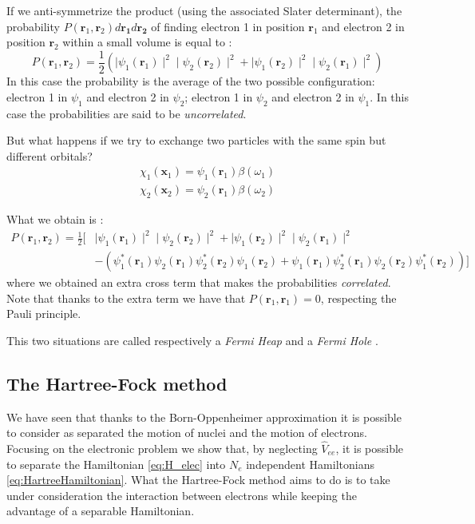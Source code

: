 \documentclass[a4paper,12pt]{article}
\begin{document}
If we anti-symmetrize the product (using the associated Slater determinant), the probability $P(\mathbf{r}_{1},\mathbf{r}_{2}) d\mathbf{r_{1}} d\mathbf{r_{2}}$ of finding electron 1 in position $\mathbf{r}_{1}$ and electron 2 in position $\mathbf{r}_{2}$ within a small volume is equal to \cite[p.52]{Attila}:
\begin{equation*}
	P(\mathbf{r}_{1},\mathbf{r}_{2}) = 
		\frac{1}{2} ( 
			\mid \psi_{1}(\mathbf{r}_1) \mid ^2    
			\mid \psi_{2}(\mathbf{r}_2) \mid ^2   
				+
			\mid \psi_{1}(\mathbf{r}_2) \mid ^2    
			\mid \psi_{2}(\mathbf{r}_1) \mid ^2   
			)
\end{equation*}
In this case the probability is the average of the two possible configuration: electron 1 in $\psi_1$ and electron 2 in $\psi_2$; electron 1 in $\psi_2$ and electron 2 in $\psi_1$.
In this case the probabilities are said to be \textit{uncorrelated}.

But what happens if we try to exchange two particles with the same spin but different orbitals?
\begin{align*}
	\chi_{1}(\mathbf{x}_{1}) = \psi_{1}(\mathbf{r}_{1}) \beta(\omega_{1})\\
	\chi_{2}(\mathbf{x}_{2}) = \psi_{2}(\mathbf{r}_{1}) \beta(\omega_{2})
\end{align*}

What we obtain is \cite[p.53]{Attila}:
\begin{align*}
	P(\mathbf{r}_{1},\mathbf{r}_{2}) = 
		\frac{1}{2} [ &
			\mid \psi_{1}(\mathbf{r}_1) \mid ^2    
			\mid \psi_{2}(\mathbf{r}_2) \mid ^2   
				+
			\mid \psi_{1}(\mathbf{r}_2) \mid ^2    
			\mid \psi_{2}(\mathbf{r}_1) \mid ^2   
\\
			& - ( \psi_{1}^*(\mathbf{r}_1) \psi_{2}(\mathbf{r}_1) \psi_{2}^*(\mathbf{r}_2) \psi_{1}(\mathbf{r}_2)
			 + \psi_{1}(\mathbf{r}_1) \psi_{2}^*(\mathbf{r}_1) \psi_{2}(\mathbf{r}_2) \psi_{1}^*(\mathbf{r}_2))]
\end{align*}
where we obtained an extra cross term that makes the probabilities \textit{correlated}. Note that thanks to the extra term we have that $P(\mathbf{r}_{1},\mathbf{r}_{1}) = 0$, respecting the Pauli principle.

This two situations are called respectively a \textit{Fermi Heap} and a \textit{Fermi Hole} \cite{Dan}.


\subsection{The Hartree-Fock method}
We have seen that thanks to the Born-Oppenheimer approximation it is possible to consider as separated the motion of nuclei and the motion of electrons. 
Focusing on the electronic problem we show that, by neglecting $\hat{V}_{ee}$, it is possible to separate the Hamiltonian \eqref{eq:H_elec} into $N_e$ independent Hamiltonians \eqref{eq:HartreeHamiltonian}.
What the Hartree-Fock method aims to do is to take under consideration the interaction between electrons while keeping the advantage of a separable Hamiltonian.
\end{document}
